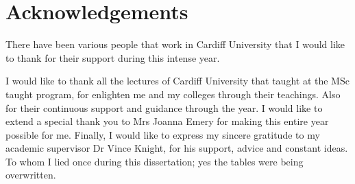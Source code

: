 \chapter{Acknowledgements}
There have been various people that work in Cardiff University that I would
like to thank for their support during this intense year.


I would like to thank all the lectures of Cardiff University that taught at
the MSc taught program, for enlighten me and my colleges through their teachings.
Also for their continuous support and guidance through the year.
I would like to extend a special thank you to Mrs Joanna Emery for making this
entire year possible for me. Finally, I would like to express my sincere gratitude
to my academic supervisor Dr Vince Knight, for his support, advice and constant
ideas. To whom I lied once during this dissertation; yes the tables were being
overwritten.
